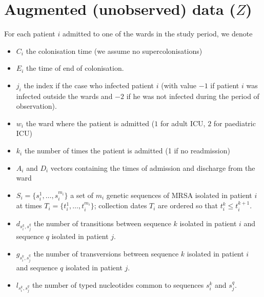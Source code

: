 \documentclass[10pt]{article}
\begin{document}
\section*{Augmented (unobserved) data ($Z$)}

For each patient $i$ admitted to one of the wards in the study period, we denote 
\begin{itemize}
	\item $C_i$ the colonisation time (we assume no supercolonisations)
	\item $E_i$ the time of end of colonisation.
	\item $j_i$ the index if the case who infected patient $i$ (with value $-1$ if patient $i$ was infected outside the wards and $-2$ if he was not infected during the period of observation). 
	\item $w_i$ the ward where the patient is admitted ($1$ for adult ICU, $2$ for paediatric ICU)
	\item $k_i$ the number of times the patient is admitted (1 if no readmission)
	\item $A_i$ and $D_i$ vectors containing the times of admission and discharge from the ward
	\item $S_i = \{s_i^{1}, \ldots, s_i^{m_i}\}$ a set of $m_i$ genetic sequences of MRSA isolated in patient $i$ at times 
$T_i = \{t_i^{1}, \ldots, t_i^{m_i}\}$; collection dates $T_i$ are ordered so that $t_i^{k} \leq t_i^{k+1}$.
 	\item $d_{s_i^k,s_j^q}$ the number of transitions between sequence $k$ isolated in patient $i$ and sequence $q$ isolated in patient $j$.
	\item $g_{s_i^k,s_j^q}$ the number of transversions between sequence $k$ isolated in patient $i$ and sequence $q$ isolated in patient $j$.
	\item $l_{s_i^k,s_j^q}$ the number of typed nucleotides common to sequences $s_i^{k}$ and $s_j^{q}$.
\end{itemize}

\end{document}
